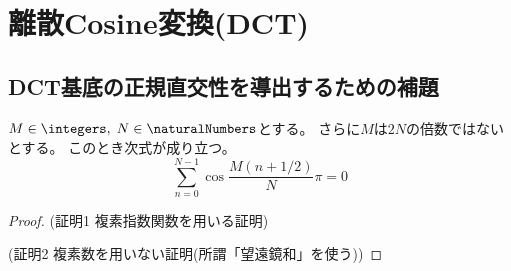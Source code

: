 \chapter{離散Cosine変換(DCT)}
    \section{DCT基底の正規直交性を導出するための補題}
        \begin{shadebox}
            $M\in\integers,\;N\in\naturalNumbers$とする。
            さらに$M$は$2N$の倍数ではないとする。
            このとき次式が成り立つ。
            \[ \sum_{n=0}^{N-1} \cos\frac{M(n+1/2)}{N}\pi = 0\]
        \end{shadebox}
        \begin{proof}
            (証明1 複素指数関数を用いる証明)
            \par\noindent
            (証明2 複素数を用いない証明(所謂「望遠鏡和」を使う))
        \end{proof}
